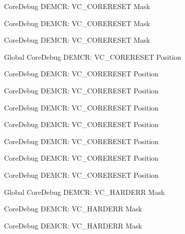 \begin{DoxyRefList}
\label{deprecated__deprecated000521}%
%
Core\+Debug DEMCR\+: VC\+\_\+\+CORERESET Mask 

\label{deprecated__deprecated000277}%
%
Core\+Debug DEMCR\+: VC\+\_\+\+CORERESET Mask 

\label{deprecated__deprecated000623}%
%
Core\+Debug DEMCR\+: VC\+\_\+\+CORERESET Mask  
\item[Global \doxylink{group___c_m_s_i_s___core_debug_ga9fcf09666f7063a7303117aa32a85d5a}{Core\+Debug\+\_\+\+DEMCR\+\_\+\+VC\+\_\+\+CORERESET\+\_\+\+Pos} ]\label{deprecated__deprecated000213}%
%
Core\+Debug DEMCR\+: VC\+\_\+\+CORERESET Position 

\label{deprecated__deprecated000276}%
%
Core\+Debug DEMCR\+: VC\+\_\+\+CORERESET Position 

\label{deprecated__deprecated000622}%
%
Core\+Debug DEMCR\+: VC\+\_\+\+CORERESET Position 

\label{deprecated__deprecated000355}%
%
Core\+Debug DEMCR\+: VC\+\_\+\+CORERESET Position 

\label{deprecated__deprecated000520}%
%
Core\+Debug DEMCR\+: VC\+\_\+\+CORERESET Position 

\label{deprecated__deprecated000137}%
%
Core\+Debug DEMCR\+: VC\+\_\+\+CORERESET Position 

\label{deprecated__deprecated000069}%
%
Core\+Debug DEMCR\+: VC\+\_\+\+CORERESET Position 

\label{deprecated__deprecated000431}%
%
Core\+Debug DEMCR\+: VC\+\_\+\+CORERESET Position  
\item[Global \doxylink{group___c_m_s_i_s___core_debug_ga803fc98c5bb85f10f0347b23794847d1}{Core\+Debug\+\_\+\+DEMCR\+\_\+\+VC\+\_\+\+HARDERR\+\_\+\+Msk} ]\label{deprecated__deprecated000275}%
%
Core\+Debug DEMCR\+: VC\+\_\+\+HARDERR Mask 

\label{deprecated__deprecated000056}%
%
Core\+Debug DEMCR\+: VC\+\_\+\+HARDERR Mask 

\label{deprecated__deprecated000200}%
%
Core\+Debug DEMCR\+: VC\+\_\+\+HARDERR Mask 


\end{DoxyRefList}
